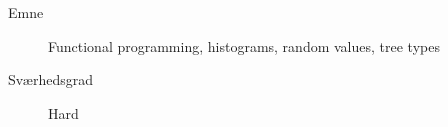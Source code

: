 \begin{description}
\item[Emne] Functional programming, histograms, random values, tree types
\item[Sværhedsgrad] Hard
\end{description}
